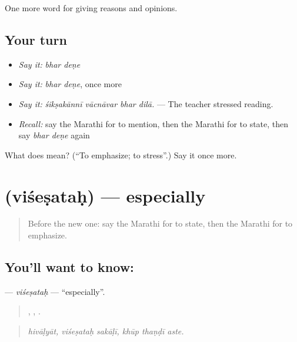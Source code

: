 \begin{grammarlens}[title={What you've built}]
One more word for giving reasons and opinions.
\end{grammarlens}

\subsection*{Your turn}
\begin{itemize}
\raggedright
  \item \emph{Say it:} \emph{bhar deṇe}
  \item \emph{Say it:} \emph{bhar deṇe}, once more
  \item \emph{Say it:} \emph{śikṣakānnī vācnāvar bhar dilā.} — The teacher stressed reading.
  \item \emph{Recall:} say the Marathi for to mention, then the Marathi for to state, then say \emph{bhar deṇe} again
\end{itemize}

\begin{tcolorbox}[breakable,colback=teal!4,colframe=teal!35!black,title={Before you move on}]
What does   mean? (\textquotedblleft{}To emphasize; to stress\textquotedblright{}.) Say it once more.
\end{tcolorbox}
\section[\texorpdfstring{\mr{विशेषतः} (viśeṣataḥ)}{विशेषतः (viśeṣataḥ)}]{ (viśeṣataḥ) — especially}

\label{lesson:MR-C352-visesatah}



\begin{quote}
Before the new one: say the Marathi for to state, then the Marathi for to emphasize.
\end{quote}

\subsection*{You'll want to know: }
\textbf{} — \emph{viśeṣataḥ} — \textquotedblleft{}especially\textquotedblright{}.

\begin{quote}
,  ,   .
\end{quote}

\begin{quote}
\emph{hivāḷyāt, viśeṣataḥ sakāḷī, khūp thaṇḍī aste.}
\end{quote}

